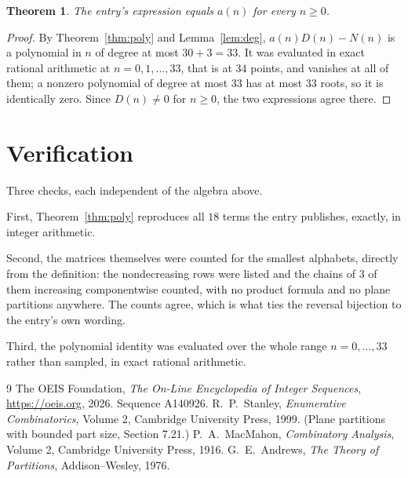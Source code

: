 \documentclass[11pt,a4paper]{article}
\theoremstyle{plain}
\newtheorem{theorem}{Theorem}
\theoremstyle{definition}
\begin{document}
\begin{theorem}
The entry's expression equals $a(n)$ for every $n\ge0$.
\end{theorem}

\begin{proof}
By Theorem~\ref{thm:poly} and Lemma~\ref{lem:deg}, $a(n)D(n)-N(n)$ is a polynomial in $n$
of degree at most $30+3=33$. It was evaluated in exact rational arithmetic at
$n=0,1,\dots,33$, that is at $34$ points, and vanishes at all of them; a nonzero polynomial
of degree at most $33$ has at most $33$ roots, so it is identically zero. Since $D(n)\neq0$
for $n\ge0$, the two expressions agree there.
\end{proof}

\section{Verification}

Three checks, each independent of the algebra above.

First, Theorem~\ref{thm:poly} reproduces all $18$ terms the entry publishes,
exactly, in integer arithmetic.

Second, the matrices themselves were counted for the smallest alphabets, directly from the
definition: the nondecreasing rows were listed and the chains of $3$ of them increasing
componentwise counted, with no product formula and no plane partitions anywhere. The counts
agree, which is what ties the reversal bijection to the entry's own wording.

Third, the polynomial identity was evaluated over the whole range $n=0,\dots,33$ rather than
sampled, in exact rational arithmetic.

\begin{thebibliography}{9}
 The OEIS Foundation, \emph{The On-Line Encyclopedia of Integer
Sequences}, \url{https://oeis.org}, 2026. Sequence A140926.
 R.~P.~Stanley, \emph{Enumerative Combinatorics}, Volume 2, Cambridge
University Press, 1999. (Plane partitions with bounded part size, Section 7.21.)
 P.~A.~MacMahon, \emph{Combinatory Analysis}, Volume 2, Cambridge
University Press, 1916.
 G.~E.~Andrews, \emph{The Theory of Partitions}, Addison--Wesley, 1976.
\end{thebibliography}
\end{document}
